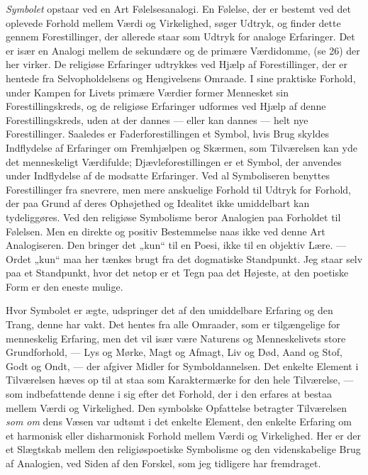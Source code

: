 \documentclass[12pt,a4paper,openany]{book}
\newcommand{\opage}[1]{\marginnote{\footnotesize\textit{[#1]}}}
\begin{document}
\opage{139}\textit{Symbolet} opstaar ved en Art Følelsesanalogi. En
Følelse, der er bestemt ved det oplevede Forhold mellem Værdi og
Virkelighed, søger Udtryk, og finder dette gennem Forestillinger, der
allerede staar som Udtryk for analoge Erfaringer. Det er især en Analogi
mellem de sekundære og de primære Værdidomme, (se 26) der her virker. De
religiøse Erfaringer udtrykkes ved Hjælp af Forestillinger, der er
hentede fra Selvopholdelsens og Hengivelsens Omraade. I sine praktiske
Forhold, under Kampen for Livets primære Værdier former Mennesket sin
Forestillingskreds, og de religiøse Erfaringer udformes ved Hjælp af
denne Forestillingskreds, uden at der dannes --- eller kan dannes ---
helt nye Forestillinger. Saaledes er Faderforestillingen et Symbol, hvis
Brug skyldes Indflydelse af Erfaringer om Fremhjælpen og Skærmen, som
Tilværelsen kan yde det menneskeligt Værdifulde; Djævleforestillingen er
et Symbol, der anvendes under Indflydelse af de modsatte Erfaringer. Ved
al Symboliseren benyttes Forestillinger fra snevrere, men mere
anskuelige Forhold til Udtryk for Forhold, der paa Grund af deres
Ophøjethed og Idealitet ikke umiddelbart kan tydeliggøres. Ved den
religiøse Symbolisme beror Analogien paa Forholdet til Følelsen. Men en
direkte og positiv Bestemmelse naas ikke ved denne Art Analogiseren. Den
bringer det „kun“ til en Poesi, ikke til en objektiv Lære. --- Ordet
„kun“ maa her tænkes brugt fra det dogmatiske Standpunkt. Jeg staar selv
paa et Standpunkt, hvor det netop er et Tegn paa det Højeste, at den
poetiske Form er den eneste mulige.

Hvor Symbolet er ægte, udspringer det af den umiddelbare Erfaring og den
Trang, denne har vakt. Det hentes fra alle Omraader, som er tilgængelige
for menneskelig Erfaring, men det vil især være Naturens og
Menneskelivets store Grundforhold, --- Lys og Mørke, Magt og Afmagt, Liv
og Død, Aand og Stof, Godt og Ondt, --- der afgiver Midler for
Symboldannelsen. Det enkelte Element i Tilværelsen hæves op til at staa
som Karaktermærke for den hele Tilværelse, --- som indbefattende denne i
sig efter det Forhold, der i den erfares at bestaa mellem Værdi og
Virkelighed. Den symbolske Opfattelse betragter Tilværelsen \textit{som
om} dens Væsen var udtømt i det enkelte Element, den enkelte Erfaring om
et harmonisk eller disharmonisk Forhold mellem Værdi og Virkelighed. Her
er der et Slægtskab mellem den religiøspoetiske Symbolisme og den
videnskabelige Brug af Analogien, ved Siden af den Forskel, som jeg
tidligere har fremdraget.
\end{document}
